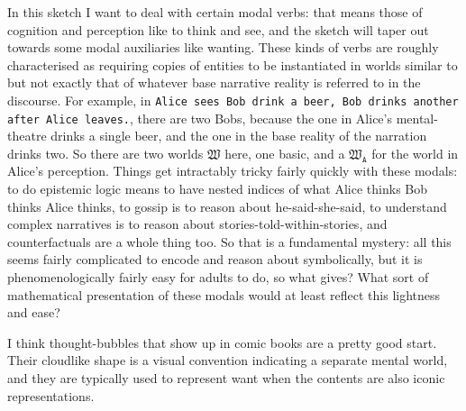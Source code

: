 In this sketch I want to deal with certain modal verbs: that means those of cognition and perception like to think and see, and the sketch will taper out towards some modal auxiliaries like wanting. These kinds of verbs are roughly characterised as requiring copies of entities to be instantiated in worlds similar to but not exactly that of whatever base narrative reality is referred to in the discourse. For example, in \texttt{Alice sees Bob drink a beer, Bob drinks another after Alice leaves.}, there are two Bobs, because the one in Alice's mental-theatre drinks a single beer, and the one in the base reality of the narration drinks two. So there are two worlds $\mathfrak{W}$ here, one basic, and a $\mathfrak{W}_{\texttt{A}}$ for the world in Alice's perception. Things get intractably tricky fairly quickly with these modals: to do epistemic logic means to have nested indices of what Alice thinks Bob thinks Alice thinks, to gossip is to reason about he-said-she-said, to understand complex narratives is to reason about stories-told-within-stories, and counterfactuals are a whole thing too. So that is a fundamental mystery: all this seems fairly complicated to encode and reason about symbolically, but it is phenomenologically fairly easy for adults to do, so what gives? What sort of mathematical presentation of these modals would at least reflect this lightness and ease?

I think thought-bubbles that show up in comic books are a pretty good start. Their cloudlike shape is a visual convention indicating a separate mental world, and they are typically used to represent want when the contents are also iconic representations.

